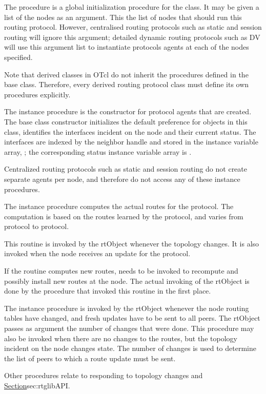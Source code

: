 \begin{list}{---}{}
\item
The procedure
is a global initialization procedure for the class.
It may be given a list of the nodes as an argument.
This the list of nodes that should run this routing protocol.
However, centralised routing protocols such as static and session routing
will ignore this argument;
detailed dynamic routing protocols such as DV will use this argument
list to instantiate protocols agents at each of the nodes specified.

Note that derived classes in OTcl do not inherit the procedures
defined in the base class. 
Therefore, every derived routing protocol class must define its own
procedures explicitly.

\item
The instance procedure
is the constructor for protocol agents that are created.
The base class constructor initializes the default preference 
for objects in this class,
identifies the interfaces incident on the node and their current status.
The interfaces are indexed by the neighbor handle and stored in the instance
variable array, ;
the corresponding status instance variable array is .

Centralized routing protocols such as static and session routing do not
create separate agents per node, and therefore do not access any of these
instance procedures.

\item
The instance procedure
computes the actual routes for the protocol.
The computation is based on the routes learned by the protocol, and
varies from protocol to protocol.

This routine is invoked by the rtObject whenever the topology changes.
It is also invoked when the node receives an update for the protocol.

If the routine computes new routes, 
 needs to be invoked
to recompute and possibly install new routes at the node.
The actual invoking of the rtObject is done by the procedure
that invoked this routine in the first place.

\item
The instance procedure
is invoked by the rtObject whenever the node routing tables have changed,
and fresh updates have to be sent to all peers.
The rtObject passes as argument the number of changes that were done.
This procedure may also be invoked when there are no changes to the routes,
but the topology incident on the node changes state.
The number of changes is used to determine the list of peers to which
a route update must be sent.
\end{list}
Other procedures relate to responding to topology changes and
\href{are described later}{Section}{sec:rtglibAPI}.

